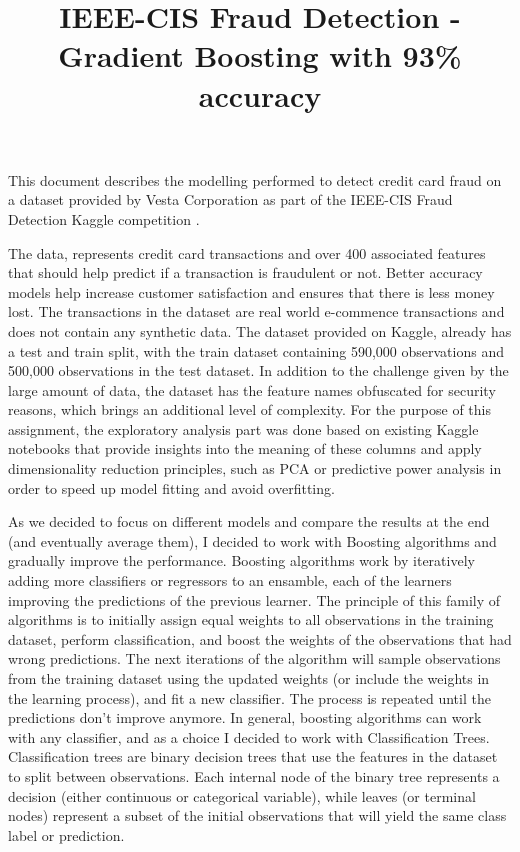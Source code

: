 \documentclass[11pt,a4paper]{article}
\date{}
\title{IEEE-CIS Fraud Detection - Gradient Boosting with 93\% accuracy}
\begin{document}
\newpage
\maketitle

This document describes the modelling performed to detect credit card fraud on a dataset provided by Vesta Corporation as part of the IEEE-CIS Fraud Detection Kaggle competition \cite{kaggle}. 

The data, represents credit card transactions and over 400 associated features that should help predict if a transaction is fraudulent or not. Better accuracy models help increase customer satisfaction and ensures that there is less money lost. The transactions in the dataset are real world e-commence transactions and does not contain any synthetic data. The dataset provided on Kaggle, already has a test and train split, with the train dataset containing 590,000 observations and 500,000 observations in the test dataset. In addition to the challenge given by the large amount of data, the dataset has the feature names obfuscated for security reasons, which brings an additional level of complexity. For the purpose of this assignment, the exploratory analysis part was done based on existing Kaggle notebooks that provide insights into the meaning of these columns and apply dimensionality reduction principles, such as PCA or predictive power analysis in order to speed up model fitting and avoid overfitting.

As we decided to focus on different models and compare the results at the end (and eventually average them), I decided to work with Boosting algorithms and gradually improve the performance. Boosting algorithms work by iteratively adding more classifiers or regressors to an ensamble, each of the learners improving the predictions of the previous learner. The principle of this family of algorithms is to initially assign equal weights to all observations in the training dataset, perform classification, and boost the weights of the observations that had wrong predictions. The next iterations of the algorithm will sample observations from the training dataset using the updated weights (or include the weights in the learning process), and fit a new classifier. The process is repeated until the predictions don't improve anymore. In general, boosting algorithms can work with any classifier, and as a choice I decided to work with Classification Trees. Classification trees are binary decision trees that use the features in the dataset to split between observations. Each internal node of the binary tree represents a decision (either continuous or categorical variable), while leaves (or terminal nodes) represent a subset of the initial observations that will yield the same class label or prediction.
\end{document}

